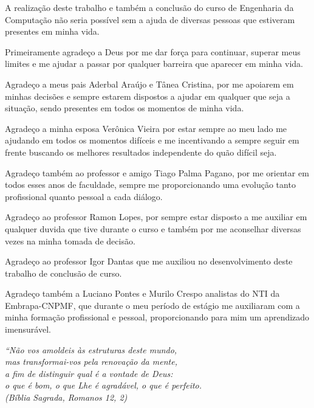 \documentclass[
12pt,				%
oneside,			%
a4paper,			%
english,			%
french,				%
spanish,			%
brazil				%
]{abntex2}
\begin{document}
\begin{agradecimentos}

A realização deste trabalho e também a conclusão do curso de Engenharia da Computação não seria possível sem a ajuda de diversas pessoas que estiveram presentes em minha vida. 

Primeiramente agradeço a Deus por me dar força para continuar, superar meus limites e me ajudar a passar por qualquer barreira que aparecer em minha vida. 

Agradeço a meus pais Aderbal Araújo e Tânea Cristina, por me apoiarem em minhas decisões e sempre estarem dispostos a ajudar em qualquer que seja a situação, sendo presentes em todos os momentos de minha vida.

Agradeço a minha esposa Verônica Vieira por estar sempre ao meu lado me ajudando em todos os momentos difíceis e me incentivando a sempre seguir em frente buscando os melhores resultados independente do quão difícil seja.

Agradeço também ao professor e amigo Tiago Palma Pagano, por me orientar em todos esses anos de faculdade, sempre me proporcionando uma evolução tanto profissional quanto pessoal a cada diálogo.

Agradeço ao professor Ramon Lopes, por sempre estar disposto a me auxiliar em qualquer duvida que tive durante o curso e também por me aconselhar diversas vezes na minha tomada de decisão.

Agradeço ao professor Igor Dantas que me auxiliou no desenvolvimento deste trabalho de conclusão de curso.

Agradeço também a Luciano Pontes e Murilo Crespo analistas do NTI da Embrapa-CNPMF, que durante o meu período de estágio me auxiliaram com a minha formação profissional e pessoal, proporcionando para mim um aprendizado imensurável.

\end{agradecimentos}



\begin{epigrafe}
\vspace*{\fill}
\begin{flushright}
	\textit{``Não vos amoldeis às estruturas deste mundo, \\
		mas transformai-vos pela renovação da mente, \\
		a fim de distinguir qual é a vontade de Deus: \\
		o que é bom, o que Lhe é agradável, o que é perfeito.\\
		(Bíblia Sagrada, Romanos 12, 2)}
\end{flushright}
\end{epigrafe}
\end{document}

